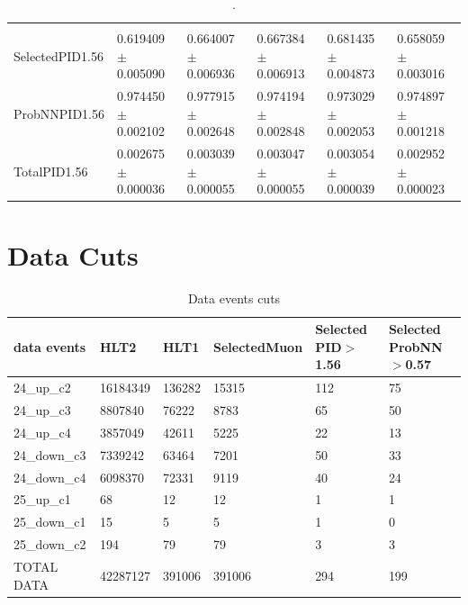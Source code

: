 \documentclass[12pt,a4paper]{article}
\begin{document}
\begin{table}[h]
\begin{tabular}{llllll}
\hline        &                         &                         &                         &                         &                         \\
 SelectedPID1.56  & 0.619409 $\pm$ 0.005090 & 0.664007 $\pm$ 0.006936 & 0.667384 $\pm$ 0.006913 & 0.681435 $\pm$ 0.004873 & 0.658059 $\pm$ 0.003016 \\
 ProbNNPID1.56    & 0.974450 $\pm$ 0.002102 & 0.977915 $\pm$ 0.002648 & 0.974194 $\pm$ 0.002848 & 0.973029 $\pm$ 0.002053 & 0.974897 $\pm$ 0.001218 \\
 TotalPID1.56     & 0.002675 $\pm$ 0.000036 & 0.003039 $\pm$ 0.000055 & 0.003047 $\pm$ 0.000055 & 0.003054 $\pm$ 0.000039 & 0.002952 $\pm$ 0.000023 \\
 \hline
\end{tabular}
\caption{.}
\end{table}

\newpage 
\section{Data Cuts}


\begin{table}[h]
\centering
\begin{tabular}{llllll}
\hline
 data events         & HLT2     & HLT1    & SelectedMuon & Selected PID$>$1.56  &  Selected ProbNN$>$0.57\\
\hline 
 24\_up\_c2          & 16184349 & 136282  & 15315        & 112   & 75 \\
 24\_up\_c3          & 8807840  & 76222   & 8783         & 65    & 50 \\
 24\_up\_c4          & 3857049  & 42611   & 5225         & 22     & 13\\
 24\_down\_c3        & 7339242  & 63464   & 7201         & 50     & 33\\
 24\_down\_c4        & 6098370  & 72331   & 9119         & 40 & 24\\
 25\_up\_c1          & 68       & 12      & 12           & 1  & 1\\
 25\_down\_c1        & 15       & 5       & 5            & 1  & 0\\
 25\_down\_c2        & 194      & 79      & 79           & 3  & 3\\
 TOTAL DATA          & 42287127 & 391006  & 391006       & 294 & 199\\
\hline 
\end{tabular}
\caption{Data events cuts}
\end{table}
\end{document}

